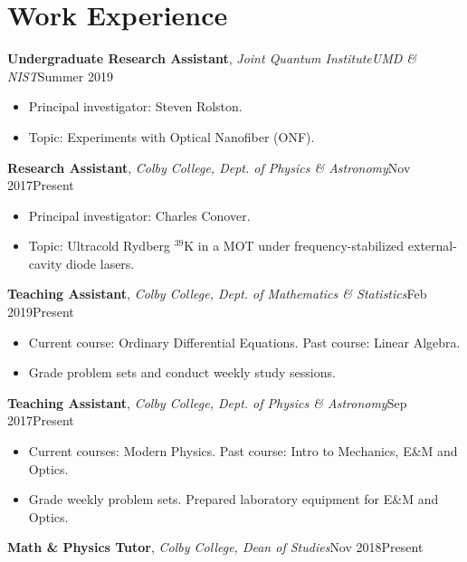 \documentclass[a4paper, 10.5pt]{article}
\begin{document}
	\section*{\normalsize{{\color{colby}\textbf{Work Experience}}}}
	\textbf{Undergraduate Research Assistant},  \textit{Joint Quantum Institute\textemdash UMD \&  NIST}\hfill Summer 2019
	\begin{itemize}[noitemsep, nolistsep]
		\setlength{\itemindent}{0.2in}
		\item Principal investigator: Steven Rolston.
		\item Topic: Experiments with Optical Nanofiber (ONF). \\
	\end{itemize}
	\indent \indent \textbf{Research Assistant}, \textit{Colby College, Dept. of Physics \& Astronomy}\hfill Nov 2017\textemdash Present
	\begin{itemize}[noitemsep, nolistsep]
		\setlength{\itemindent}{0.2in}
		\item Principal investigator: Charles Conover.
		\item Topic: Ultracold Rydberg $^{\text{39}}$K in a MOT under frequency-stabilized external-cavity diode lasers.\\

	\end{itemize}	
	\indent \indent \textbf{Teaching Assistant}, \textit{Colby College, Dept. of Mathematics \& Statistics}\hfill Feb 2019\textemdash Present 
	\begin{itemize}[noitemsep, nolistsep]
		\setlength{\itemindent}{0.2in}
		\item Current course: Ordinary Differential Equations. Past course: Linear Algebra.
		\item Grade problem sets and conduct weekly study sessions. \\
	\end{itemize}
	\indent \indent \textbf{Teaching Assistant}, \textit{Colby College, Dept. of Physics \& Astronomy}\hfill Sep 2017\textemdash Present
	\begin{itemize}[noitemsep, nolistsep]
		\setlength{\itemindent}{0.2in}
		\item Current courses: Modern Physics. Past course: Intro to Mechanics, E\&M and Optics. 
		\item Grade weekly problem sets. Prepared laboratory equipment for E\&M and Optics.\\
	\end{itemize}
	\indent \indent \textbf{Math \& Physics Tutor}, \textit{Colby College, Dean of Studies}\hfill Nov 2018\textemdash Present
\end{document}
